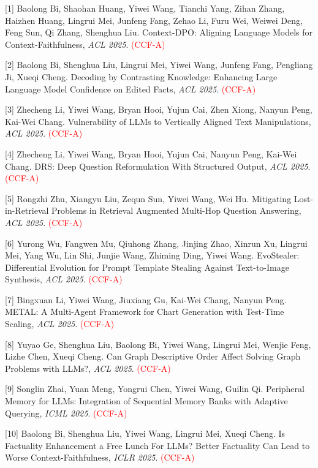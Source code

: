 [1] Baolong Bi, Shaohan Huang, Yiwei Wang, Tianchi Yang, Zihan Zhang, Haizhen Huang, Lingrui Mei, Junfeng Fang, Zehao Li, Furu Wei, Weiwei Deng, Feng Sun, Qi Zhang, Shenghua Liu. Context-DPO: Aligning Language Models for Context-Faithfulness, \textit{ACL 2025}. \textcolor{red}{(CCF-A)}

[2] Baolong Bi, Shenghua Liu, Lingrui Mei, Yiwei Wang, Junfeng Fang, Pengliang Ji, Xueqi Cheng. Decoding by Contrasting Knowledge: Enhancing Large Language Model Confidence on Edited Facts, \textit{ACL 2025}. \textcolor{red}{(CCF-A)}

[3] Zhecheng Li, Yiwei Wang, Bryan Hooi, Yujun Cai, Zhen Xiong, Nanyun Peng, Kai-Wei Chang. Vulnerability of LLMs to Vertically Aligned Text Manipulations, \textit{ACL 2025}. \textcolor{red}{(CCF-A)}

[4] Zhecheng Li, Yiwei Wang, Bryan Hooi, Yujun Cai, Nanyun Peng, Kai-Wei Chang. DRS: Deep Question Reformulation With Structured Output, \textit{ACL 2025}. \textcolor{red}{(CCF-A)}

[5] Rongzhi Zhu, Xiangyu Liu, Zequn Sun, Yiwei Wang, Wei Hu. Mitigating Lost-in-Retrieval Problems in Retrieval Augmented Multi-Hop Question Answering, \textit{ACL 2025}. \textcolor{red}{(CCF-A)}

[6] Yurong Wu, Fangwen Mu, Qiuhong Zhang, Jinjing Zhao, Xinrun Xu, Lingrui Mei, Yang Wu, Lin Shi, Junjie Wang, Zhiming Ding, Yiwei Wang. EvoStealer: Differential Evolution for Prompt Template Stealing Against Text-to-Image Synthesis, \textit{ACL 2025}. \textcolor{red}{(CCF-A)}

[7] Bingxuan Li, Yiwei Wang, Jiuxiang Gu, Kai-Wei Chang, Nanyun Peng. METAL: A Multi-Agent Framework for Chart Generation with Test-Time Scaling, \textit{ACL 2025}. \textcolor{red}{(CCF-A)}

[8] Yuyao Ge, Shenghua Liu, Baolong Bi, Yiwei Wang, Lingrui Mei, Wenjie Feng, Lizhe Chen, Xueqi Cheng. Can Graph Descriptive Order Affect Solving Graph Problems with LLMs?, \textit{ACL 2025}. \textcolor{red}{(CCF-A)}

[9] Songlin Zhai, Yuan Meng, Yongrui Chen, Yiwei Wang, Guilin Qi. Peripheral Memory for LLMs: Integration of Sequential Memory Banks with Adaptive Querying, \textit{ICML 2025}. \textcolor{red}{(CCF-A)}

[10] Baolong Bi, Shenghua Liu, Yiwei Wang, Lingrui Mei, Xueqi Cheng. Is Factuality Enhancement a Free Lunch For LLMs? Better Factuality Can Lead to Worse Context-Faithfulness, \textit{ICLR 2025}. \textcolor{red}{(CCF-A)}


